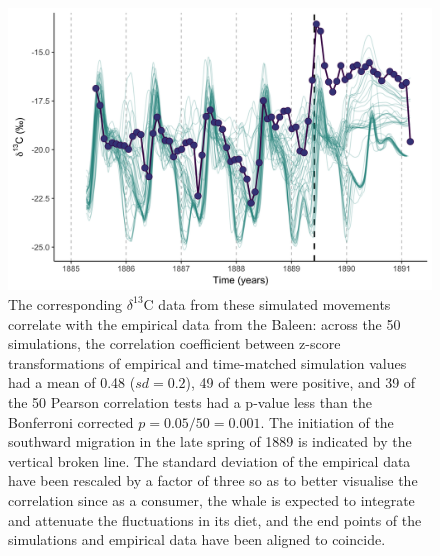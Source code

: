 \documentclass[a4paper,12pt]{article}
\begin{document}
\begin{figure}
  \centering
  \includegraphics[width = \linewidth]{figures/Figure-3-migratory-model-d13C.png}
  \caption{The corresponding $\delta^{13}$C data from these simulated movements correlate with the empirical data from the Baleen: across the 50 simulations, the correlation coefficient between z-score transformations of empirical and time-matched simulation values had a mean of 0.48 ($sd = 0.2$), 49 of them were positive,  and 39 of the 50 Pearson correlation tests had a p-value less than the Bonferroni corrected $p = 0.05/50 = 0.001$. The initiation of the southward migration in the late spring of 1889 is indicated by the vertical broken line. The standard deviation of the empirical data have been rescaled by a factor of three so as to better visualise the correlation since as a consumer, the whale is expected to integrate and attenuate the fluctuations in its diet, and the end points of the simulations and empirical data have been aligned to coincide.}
  \label{fig3}
\end{figure}
 
\end{document}
